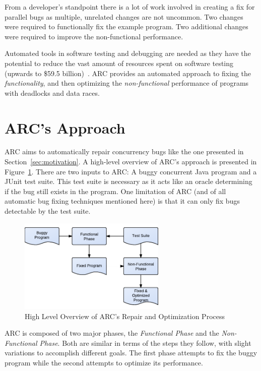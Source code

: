 \documentclass[10pt, conference, compsocconf]{IEEEtran}
\begin{document}
From a developer's standpoint there is a lot of work involved in creating a fix for parallel bugs as multiple, unrelated changes are not uncommon. Two changes  were required to functionally fix the example program. Two additional changes were required to improve the non-functional performance.

Automated tools in software testing and debugging are needed as they have the potential to reduce the vast amount of resources spent on software testing (upwards to \$59.5 billion)~\cite{RTI02}. ARC provides an automated approach to fixing the \textit{functionality}, and then optimizing the \textit{non-functional} performance of programs with deadlocks and data races.

\section{ARC's Approach}
\label{sec:approach}

ARC aims to automatically repair concurrency bugs like the one
presented in Section~\ref{sec:motivation}. A high-level overview of ARC's
approach is presented in Figure~\ref{fig:process}. There are two inputs to ARC: A buggy concurrent Java program and a JUnit test suite. This
test suite is necessary as it acts like an oracle determining if the bug
still exists in the program. One limitation of ARC (and of all automatic bug
fixing techniques mentioned here) is that it can only fix bugs detectable by
the test suite.

\begin{figure}[!h]
  \centering
  \includegraphics[width=7.0cm]{figures/process.pdf}
  \caption{High Level Overview of ARC's Repair and Optimization Process}
  \label{fig:process}
\end{figure}

ARC is composed of two major phases, the \textit{Functional Phase} and the
\textit{Non-Functional Phase}. Both are similar in terms of the steps
they follow, with slight variations to accomplish different goals. The first phase attempts to fix the buggy program while the second attempts to optimize its performance.
\end{document}
